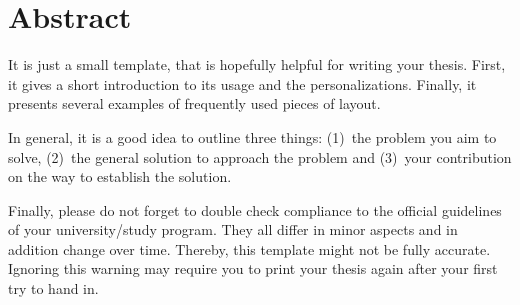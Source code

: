 \documentclass[../main.tex]{subfiles}
\begin{document}
\chapter*{Abstract}
\label{chap:abstract}

It is just a small template, that is hopefully helpful for writing your thesis.
First, it gives a short introduction to its usage and the personalizations.
Finally, it presents several examples of frequently used pieces of layout.

In general, it is a good idea to outline three things:
(1)~the problem you aim to solve,
(2)~the general solution to approach the problem and
(3)~your contribution on the way to establish the solution.

Finally, please do not forget to double check compliance to the official guidelines of your university/study program.
They all differ in minor aspects and in addition change over time.
Thereby, this template might not be fully accurate.
Ignoring this warning may require you to print your thesis again after your first try to hand in.
\end{document}
